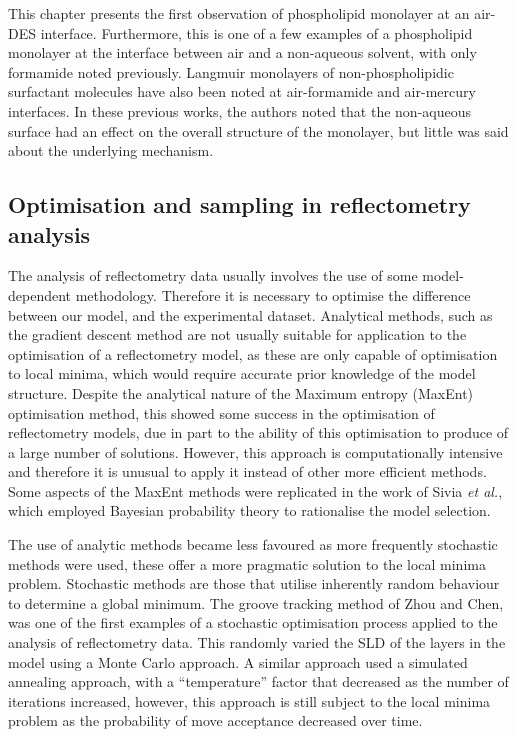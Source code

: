 This chapter presents the first observation of phospholipid monolayer at an air-DES interface.
Furthermore, this is one of a few examples of a phospholipid monolayer at the interface between air and a non-aqueous solvent, with only formamide noted previously.\autocite{graner_phospholipidic_1995}
Langmuir monolayers of non-phospholipidic surfactant molecules have also been noted at air-formamide and air-mercury interfaces.\autocite{weinbach_self-assembled_1993,magnussen_self-assembly_1996,kraack_structure_2002}
In these previous works, the authors noted that the non-aqueous surface had an effect on the overall structure of the monolayer, but little was said about the underlying mechanism.

\subsection{Optimisation and sampling in reflectometry analysis}
The analysis of reflectometry data usually involves the use of some model-dependent methodology.
Therefore it is necessary to optimise the difference between our model, and the experimental dataset.
Analytical methods, such as the gradient descent method are not usually suitable for application to the optimisation of a reflectometry model, as these are only capable of optimisation to local minima, which would require accurate prior knowledge of the model structure.\autocite{lovell_analysis_1999}
Despite the analytical nature of the Maximum entropy (MaxEnt) optimisation method, this showed some success in the optimisation of reflectometry models, due in part to the ability of this optimisation to produce of a large number of solutions.\autocite{geoghegan_experimental_1996,bucknall_neutron_1997}
However, this approach is computationally intensive and therefore it is unusual to apply it instead of other more efficient methods.
Some aspects of the MaxEnt methods were replicated in the work of Sivia \emph{et al.}, which employed Bayesian probability theory to rationalise the model selection.\autocite{geoghegan_experimental_1996,sivia_introduction_1993,sivia_bayesian_1998,sivia_analysis_1991}

The use of analytic methods became less favoured as more frequently stochastic methods were used, these offer a more pragmatic solution to the local minima problem.
Stochastic methods are those that utilise inherently random behaviour to determine a global minimum.
The groove tracking method of Zhou and Chen,\autocite{zhou_model-independent_1993,zhou_theoretical_1995} was one of the first examples of a stochastic optimisation process applied to the analysis of reflectometry data.
This randomly varied the SLD of the layers in the model using a Monte Carlo approach.
A similar approach used a simulated annealing approach, with a ``temperature'' factor that decreased as the number of iterations increased,\autocite{kunz_model-free_1993} however, this approach is still subject to the local minima problem as the probability of move acceptance decreased over time.

